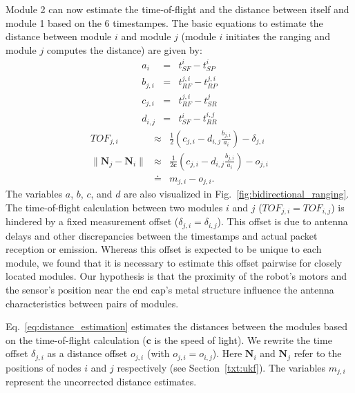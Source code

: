 Module 2 can now estimate the time-of-flight and the distance between itself and module 1 based on the 6 timestampes.
The basic equations to estimate the distance between module $i$ and module $j$ (module $i$ initiates the ranging and module $j$ computes the distance) are given by:
\begin{eqnarray} %
a_{i} &=& t_{SF}^i-t_{SP}^i\\
b_{j,i} &=& t_{RF}^{j,i}-t_{RP}^{j,i}\\ %
c_{j,i} &=& t_{RF}^{j,i}-t_{SR}^j\\  
d_{i,j} &=& t_{SF}^i-t_{RR}^{i,j} %
\end{eqnarray}
\begin{eqnarray}
{TOF}_{j,i}  &\approx& \frac{1}{2}\left(c_{j,i}-d_{i,j}\frac{b_{j,i}}{a_i} \right)-\delta_{j,i}\\
\|\bm{N}_j - \bm{N}_i\| &\approx& \frac{1}{2\bm{c}}\left(c_{j,i}-d_{i,j}\frac{b_{j,i}}{a_i} \right)-o_{j,i} \label{eq:distance_estimation}\\
&\doteq& m_{j,i}-o_{j,i} .
\end{eqnarray}
The variables $a$, $b$, $c$, and $d$ are also visualized in Fig.~\ref{fig:bidirectional_ranging}.
The time-of-flight calculation between two modules $i$ and $j$ ($TOF_{j,i}=TOF_{i,j}$) is hindered by a fixed measurement offset ($\delta_{j,i}=\delta_{i,j}$).
This offset is due to antenna delays and other discrepancies  between the timestamps and actual packet reception or emission.
Whereas this offset is expected to be unique to each module, we found that it is necessary to estimate this offset pairwise for closely located modules.
Our hypothesis is that the proximity of the robot's motors and the sensor's position near the end cap's metal structure influence the antenna characteristics between pairs of modules.

Eq.~\ref{eq:distance_estimation} estimates the distances between the modules based on the time-of-flight calculation ($\bm{c}$ is the speed of light).
We rewrite the time offset $\delta_{j,i}$ as a distance offset $o_{j,i}$ (with $o_{j,i}=o_{i,j}$).
Here $\bm{N}_i$ and $\bm{N}_j$ refer to the positions of nodes $i$ and $j$ respectively (see Section~\ref{txt:ukf}).
The variables $m_{j,i}$ represent the uncorrected distance estimates.



